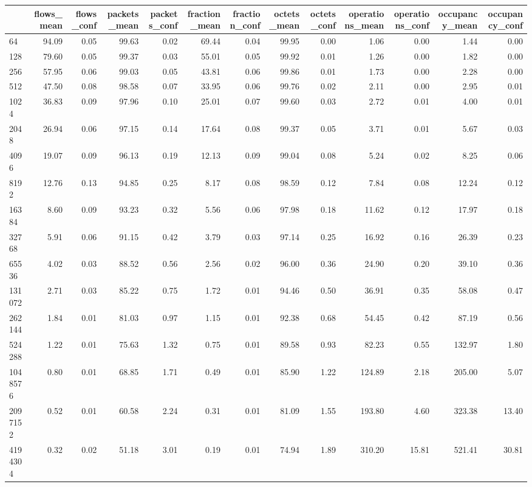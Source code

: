\begin{tabular}{lrrrrrrrrrrrr}
\toprule
 & flows_mean & flows_conf & packets_mean & packets_conf & fraction_mean & fraction_conf & octets_mean & octets_conf & operations_mean & operations_conf & occupancy_mean & occupancy_conf \\
\midrule
64 & 94.09 & 0.05 & 99.63 & 0.02 & 69.44 & 0.04 & 99.95 & 0.00 & 1.06 & 0.00 & 1.44 & 0.00 \\
128 & 79.60 & 0.05 & 99.37 & 0.03 & 55.01 & 0.05 & 99.92 & 0.01 & 1.26 & 0.00 & 1.82 & 0.00 \\
256 & 57.95 & 0.06 & 99.03 & 0.05 & 43.81 & 0.06 & 99.86 & 0.01 & 1.73 & 0.00 & 2.28 & 0.00 \\
512 & 47.50 & 0.08 & 98.58 & 0.07 & 33.95 & 0.06 & 99.76 & 0.02 & 2.11 & 0.00 & 2.95 & 0.01 \\
1024 & 36.83 & 0.09 & 97.96 & 0.10 & 25.01 & 0.07 & 99.60 & 0.03 & 2.72 & 0.01 & 4.00 & 0.01 \\
2048 & 26.94 & 0.06 & 97.15 & 0.14 & 17.64 & 0.08 & 99.37 & 0.05 & 3.71 & 0.01 & 5.67 & 0.03 \\
4096 & 19.07 & 0.09 & 96.13 & 0.19 & 12.13 & 0.09 & 99.04 & 0.08 & 5.24 & 0.02 & 8.25 & 0.06 \\
8192 & 12.76 & 0.13 & 94.85 & 0.25 & 8.17 & 0.08 & 98.59 & 0.12 & 7.84 & 0.08 & 12.24 & 0.12 \\
16384 & 8.60 & 0.09 & 93.23 & 0.32 & 5.56 & 0.06 & 97.98 & 0.18 & 11.62 & 0.12 & 17.97 & 0.18 \\
32768 & 5.91 & 0.06 & 91.15 & 0.42 & 3.79 & 0.03 & 97.14 & 0.25 & 16.92 & 0.16 & 26.39 & 0.23 \\
65536 & 4.02 & 0.03 & 88.52 & 0.56 & 2.56 & 0.02 & 96.00 & 0.36 & 24.90 & 0.20 & 39.10 & 0.36 \\
131072 & 2.71 & 0.03 & 85.22 & 0.75 & 1.72 & 0.01 & 94.46 & 0.50 & 36.91 & 0.35 & 58.08 & 0.47 \\
262144 & 1.84 & 0.01 & 81.03 & 0.97 & 1.15 & 0.01 & 92.38 & 0.68 & 54.45 & 0.42 & 87.19 & 0.56 \\
524288 & 1.22 & 0.01 & 75.63 & 1.32 & 0.75 & 0.01 & 89.58 & 0.93 & 82.23 & 0.55 & 132.97 & 1.80 \\
1048576 & 0.80 & 0.01 & 68.85 & 1.71 & 0.49 & 0.01 & 85.90 & 1.22 & 124.89 & 2.18 & 205.00 & 5.07 \\
2097152 & 0.52 & 0.01 & 60.58 & 2.24 & 0.31 & 0.01 & 81.09 & 1.55 & 193.80 & 4.60 & 323.38 & 13.40 \\
4194304 & 0.32 & 0.02 & 51.18 & 3.01 & 0.19 & 0.01 & 74.94 & 1.89 & 310.20 & 15.81 & 521.41 & 30.81 \\

\end{tabular}
